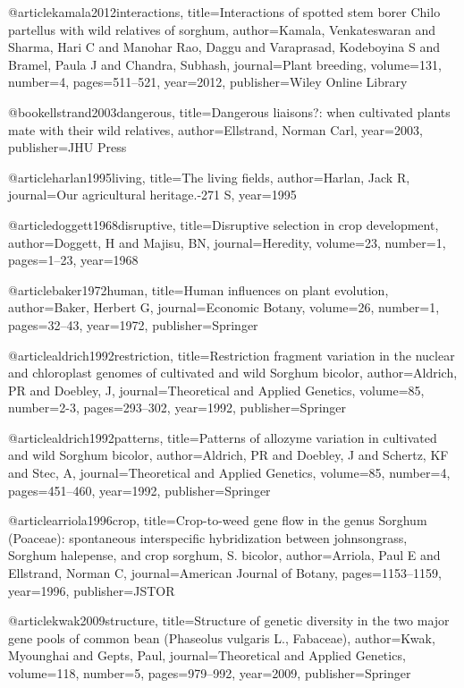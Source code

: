 {@article{kamala2012interactions,
  title={Interactions of spotted stem borer Chilo partellus with wild relatives of sorghum},
  author={Kamala, Venkateswaran and Sharma, Hari C and Manohar Rao, Daggu and Varaprasad, Kodeboyina S and Bramel, Paula J and Chandra, Subhash},
  journal={Plant breeding},
  volume={131},
  number={4},
  pages={511--521},
  year={2012},
  publisher={Wiley Online Library}
}

@book{ellstrand2003dangerous,
  title={Dangerous liaisons?: when cultivated plants mate with their wild relatives},
  author={Ellstrand, Norman Carl},
  year={2003},
  publisher={JHU Press}
}

@article{harlan1995living,
  title={The living fields},
  author={Harlan, Jack R},
  journal={Our agricultural heritage.-271 S},
  year={1995}
}

@article{doggett1968disruptive,
  title={Disruptive selection in crop development},
  author={Doggett, H and Majisu, BN},
  journal={Heredity},
  volume={23},
  number={1},
  pages={1--23},
  year={1968}
}

@article{baker1972human,
  title={Human influences on plant evolution},
  author={Baker, Herbert G},
  journal={Economic Botany},
  volume={26},
  number={1},
  pages={32--43},
  year={1972},
  publisher={Springer}
}

@article{aldrich1992restriction,
  title={Restriction fragment variation in the nuclear and chloroplast genomes of cultivated and wild Sorghum bicolor},
  author={Aldrich, PR and Doebley, J},
  journal={Theoretical and Applied Genetics},
  volume={85},
  number={2-3},
  pages={293--302},
  year={1992},
  publisher={Springer}
}

@article{aldrich1992patterns,
  title={Patterns of allozyme variation in cultivated and wild Sorghum bicolor},
  author={Aldrich, PR and Doebley, J and Schertz, KF and Stec, A},
  journal={Theoretical and Applied Genetics},
  volume={85},
  number={4},
  pages={451--460},
  year={1992},
  publisher={Springer}
}

@article{arriola1996crop,
  title={Crop-to-weed gene flow in the genus Sorghum (Poaceae): spontaneous interspecific hybridization between johnsongrass, Sorghum halepense, and crop sorghum, S. bicolor},
  author={Arriola, Paul E and Ellstrand, Norman C},
  journal={American Journal of Botany},
  pages={1153--1159},
  year={1996},
  publisher={JSTOR}
}

@article{kwak2009structure,
  title={Structure of genetic diversity in the two major gene pools of common bean (Phaseolus vulgaris L., Fabaceae)},
  author={Kwak, Myounghai and Gepts, Paul},
  journal={Theoretical and Applied Genetics},
  volume={118},
  number={5},
  pages={979--992},
  year={2009},
  publisher={Springer}
}

}
